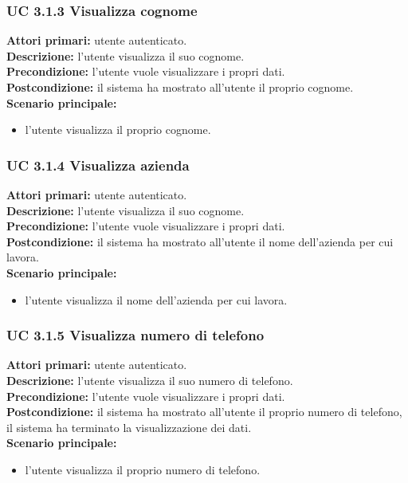 \subsubsection{UC 3.1.3 Visualizza cognome}
\noindent 
\textbf{Attori primari:} utente autenticato.\\
\textbf{Descrizione:} l'utente visualizza il suo cognome.\\
\textbf{Precondizione:} l'utente vuole visualizzare i propri dati.\\
\textbf{Postcondizione:} il sistema ha mostrato all'utente il proprio cognome.\\
\textbf{Scenario principale:}
\begin{itemize}
\item l'utente visualizza il proprio cognome.\\
\end{itemize}

\subsubsection{UC 3.1.4 Visualizza azienda}
\noindent 
\textbf{Attori primari:} utente autenticato.\\
\textbf{Descrizione:} l'utente visualizza il suo cognome.\\
\textbf{Precondizione:} l'utente vuole visualizzare i propri dati.\\
\textbf{Postcondizione:} il sistema ha mostrato all'utente il nome dell'azienda per cui lavora.\\
\textbf{Scenario principale:}
\begin{itemize}
\item l'utente visualizza il nome dell'azienda per cui lavora.\\
\end{itemize}

\subsubsection{UC 3.1.5 Visualizza numero di telefono}
\noindent 
\textbf{Attori primari:} utente autenticato.\\
\textbf{Descrizione:} l'utente visualizza il suo numero di telefono.\\
\textbf{Precondizione:} l'utente vuole visualizzare i propri dati.\\
\textbf{Postcondizione:} il sistema ha mostrato all'utente il proprio numero di telefono, il sistema ha terminato la visualizzazione dei dati.\\
\textbf{Scenario principale:}
\begin{itemize}
\item l'utente visualizza il proprio numero di telefono.\\
\end{itemize}

